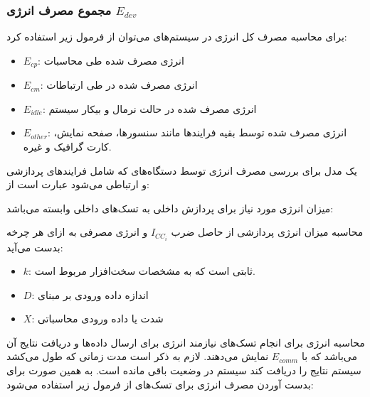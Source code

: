 \subsubsection{مجموع مصرف انرژی $E_{dev}$}

برای محاسبه مصرف کل انرژی در سیستم‌های  می‌توان از فرمول زیر استفاده
کرد:


\begin{itemize}
    \item $E_{cp}$: انرژی مصرف شده طی محاسبات
    \item $E_{cm}$: انرژی مصرف شده در طی ارتباطات
    \item $E_{idle}$: انرژی مصرف شده در حالت نرمال و بیکار سیستم
    \item $E_{other}$: انرژی مصرف شده توسط بقیه فرایند‌ها مانند سنسور‌ها، صفحه
    نمایش، کارت گرافیک و غیره.
\end{itemize}

یک مدل برای بررسی مصرف انرژی توسط دستگاه‌های  که شامل فرایند‌های پردازشی
و ارتباطی می‌شود عبارت است از:


میزان انرژی مورد نیاز برای پردازش داخلی به تسک‌های داخلی وابسته می‌باشد:


محاسبه میزان انرژی پردازشی از حاصل ضرب $I_{CC_i}$ و انرژی مصرفی  به ازای
هر چرخه  بدست می‌آید:


\begin{itemize}
    \item $k$: ثابتی است که به مشخصات سخت‌افزار مربوط است.
    \item $D$: اندازه داده ورودی بر مبنای 
    \item $X$: شدت یا داده ورودی محاسباتی
\end{itemize}

محاسبه انرژی برای انجام تسک‌های  نیازمند انرژی برای ارسال داده‌ها
و دریافت نتایج آن می‌باشد که با $E_{comm}$ نمایش می‌دهند. لازم به ذکر است مدت
زمانی که طول می‌کشد سیستم نتایج را دریافت کند سیستم در وضعیت  باقی
مانده است. به همین صورت برای بدست آوردن مصرف انرژی برای تسک‌های 
از فرمول زیر استفاده می‌شود:


